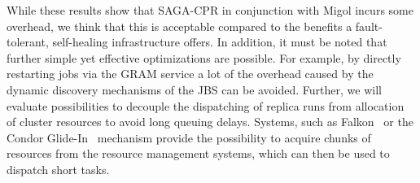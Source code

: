 \documentclass[conference,final]{IEEEtran}
\begin{document}



While these results show that SAGA-CPR in conjunction with Migol
incurs some overhead, we think that this is acceptable compared to the
benefits a fault-tolerant, self-healing infrastructure offers. In
addition, it must be noted that further simple yet effective
optimizations are possible. For example, by directly restarting jobs
via the GRAM service a lot of the overhead caused by the dynamic
discovery mechanisms of the JBS can
be avoided. Further, we will evaluate possibilities to decouple
the dispatching of replica runs from allocation of cluster resources 
to avoid long queuing delays. Systems, 
such as Falkon~\cite{1362680} or the Condor Glide-In~\cite{citeulike:291860} 
mechanism provide the possibility to acquire chunks of resources 
from the resource management systems, which can
then be used to dispatch short tasks.
\end{document}

